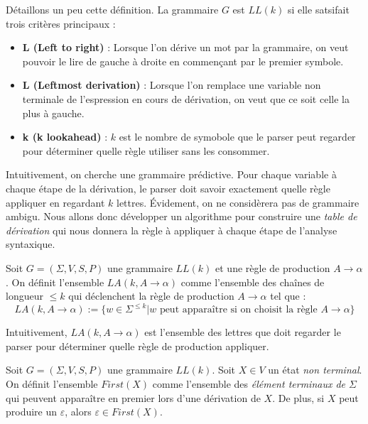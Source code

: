 \begin{remark}
    Détaillons un peu cette définition. La grammaire $G$ est $LL(k)$ si elle satsifait trois critères 
    principaux : 
    \begin{itemize}
        \item \textbf{L (Left to right)} : Lorsque l'on dérive un mot par la grammaire, on veut pouvoir 
        le lire de gauche à droite en commençant par le premier symbole. 
        \item \textbf{L (Leftmost derivation)} : Lorsque l'on remplace une variable non terminale 
        de l'espression en cours de dérivation, on veut que ce soit celle la plus à gauche. 
        \item \textbf{k (k lookahead)} : $k$ est le nombre de symobole que le parser peut regarder 
        pour déterminer quelle règle utiliser sans les consommer. 
    \end{itemize}
\end{remark}

Intuitivement, on cherche une grammaire prédictive. Pour chaque variable à chaque étape de la dérivation, 
le parser doit savoir exactement quelle règle appliquer en regardant $k$ lettres. Évidement, on ne considèrera 
pas de grammaire ambigu. Nous allons donc développer un algorithme pour construire une \emph{table de dérivation} 
qui nous donnera la règle à appliquer à chaque étape de l'analyse syntaxique. 

\begin{definition}[$k$ - Lookadhead]
    Soit $G = ( \Sigma, V, S, P)$ une grammaire $LL(k)$ et une règle de production $A \rightarrow \alpha$. On définit 
    l'ensemble $LA(k, A \rightarrow \alpha)$ comme l'ensemble des chaînes de longueur $ \leqslant k$ qui déclenchent 
    la règle de production $A \rightarrow \alpha$ tel que : 
        \[ \boxed{LA(k, A \rightarrow \alpha) := \{w \in \Sigma^{ \leqslant k} | w \text{ peut apparaître si on choisit la règle } A \rightarrow \alpha\}} \] 
\end{definition}

Intuitivement, $LA(k, A \rightarrow \alpha)$ est l'ensemble des lettres que doit regarder le parser pour déterminer 
quelle règle de production appliquer. 

\begin{definition}
    Soit $G = ( \Sigma, V, S, P)$ une grammaire $LL(k)$. 
    Soit $X \in V$ un état \emph{non terminal}. On définit l'ensemble $First(X)$ comme l'ensemble 
    des \emph{élément terminaux de $ \Sigma$} qui peuvent apparaître en premier lors d'une dérivation de $X$. 
    De plus, si $X$ peut produire un $ \varepsilon$, alors $ \varepsilon \in  First(X)$. 
\end{definition}

